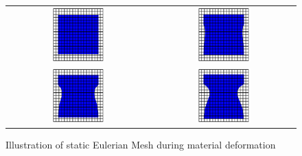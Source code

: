 \begin{figure}[htb]
\centering
\begin{tabular}{cc}
	\includegraphics[width=0.4\textwidth]{../figures/eulerian_mesh_movement_001.png}
 &  \includegraphics[width=0.4\textwidth]{../figures/eulerian_mesh_movement_002.png} 
 \\

	\includegraphics[width=0.4\textwidth]{../figures/eulerian_mesh_movement_003.png} 
 &  \includegraphics[width=0.4\textwidth]{../figures/eulerian_mesh_movement_004.png}  
 \\

\end{tabular}
\caption[bla]%
{Illustration of static Eulerian Mesh during material deformation \protect\footnotemark}
\label{fig:EulerMesh}
\end{figure}


